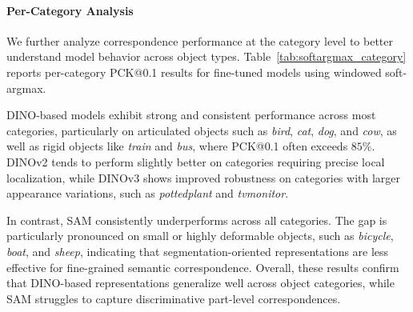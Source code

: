 
\paragraph{Per-Category Analysis}

We further analyze correspondence performance at the category level to better understand model behavior across object types.
Table~\ref{tab:softargmax_category} reports per-category PCK@0.1 results for fine-tuned models using windowed soft-argmax.

DINO-based models exhibit strong and consistent performance across most categories, particularly on articulated objects such as \emph{bird}, \emph{cat}, \emph{dog}, and \emph{cow},
as well as rigid objects like \emph{train} and \emph{bus}, where PCK@0.1 often exceeds $85\%$.
DINOv2 tends to perform slightly better on categories requiring precise local localization, while DINOv3 shows improved robustness on categories with
larger appearance variations, such as \emph{pottedplant} and \emph{tvmonitor}.

In contrast, SAM consistently underperforms across all categories.
The gap is particularly pronounced on small or highly deformable objects, such as \emph{bicycle}, \emph{boat}, and \emph{sheep},
indicating that segmentation-oriented representations are less effective for fine-grained semantic correspondence.
Overall, these results confirm that DINO-based representations generalize well across object categories,
while SAM struggles to capture discriminative part-level correspondences.


